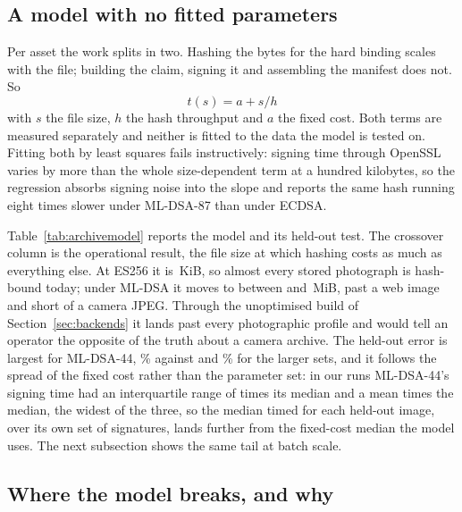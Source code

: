 \subsection{A model with no fitted parameters}

Per asset the work splits in two. Hashing the bytes for the hard binding
scales with the file; building the claim, signing it and assembling the
manifest does not. So
\begin{equation}
t(s) = a + s/h
\label{eq:resign}
\end{equation}
with $s$ the file size, $h$ the hash throughput and $a$ the fixed cost. Both
terms are measured separately and neither is fitted to the data the model is
tested on. Fitting both by least squares fails instructively: signing time
through OpenSSL varies by more than the whole size-dependent term at a hundred
kilobytes, so the regression absorbs signing noise into the slope and reports
the same hash running eight times slower under ML-DSA-87 than under ECDSA.



Table~\ref{tab:archivemodel} reports the model and its held-out test. The
crossover column is the operational result, the file size at which hashing
costs as much as everything else. At ES256 it is \NarchCrossES\,KiB, so almost
every stored photograph is hash-bound today; under ML-DSA it moves to between
\NarchCrossLo{} and \NarchCrossHi\,MiB, past a web image and short of a camera
JPEG. Through the unoptimised build of Section~\ref{sec:backends} it lands past every photographic profile and would tell an operator the opposite of the truth about a camera archive. The held-out error is largest for ML-DSA-44, \NarchHeldDSAfortyfour\% against \NarchHeldDSAsixtyfive{} and \NarchHeldDSAeightyseven\% for the larger sets, and it follows the spread of the fixed cost rather than the parameter set: in our runs ML-DSA-44's signing time had an interquartile range of \NarchIqrRelDSAfortyfour{} times its median and a mean \NarchTailOfDSAfortyfour{} times the median, the widest of the three, so the median timed for each held-out image, over its own set of signatures, lands further from the fixed-cost median the model uses. The next subsection shows the same tail at batch scale.

\subsection{Where the model breaks, and why}



